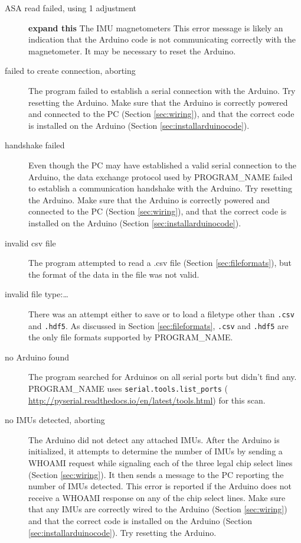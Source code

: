 \documentclass[11pt,letterpaper,article,oneside]{memoir}
\newcommand{\name}{PROGRAM\_NAME}
\newcommand{\csv}{\texttt{.csv}}
\newcommand{\hdf}{\texttt{.hdf5}}
\begin{document}
\begin{description}

\item[ASA read failed, using 1 adjustment]
\textbf{expand this}
The IMU magnetometers 
This error message is likely an indication that the Arduino code is not
communicating correctly with the magnetometer. It may be necessary to reset the
Arduino.

\item[failed to create connection, aborting]
The program failed to establish a serial connection with the Arduino.  Try
resetting the Arduino.  Make sure that the Arduino is correctly powered and
connected to the PC (Section \ref{sec:wiring}), and that the correct code is
installed on the Arduino (Section \ref{sec:installarduinocode}).

\item[handshake failed]
Even though the PC may have established a valid serial connection to the
Arduino, the data exchange protocol used by \name{} failed to establish a
communication handshake with the Arduino.  Try resetting the Arduino.  Make sure
that the Arduino is correctly powered and connected to the PC (Section
\ref{sec:wiring}), and that the correct code is installed on the Arduino
(Section \ref{sec:installarduinocode}).

\item[invalid csv file]
The program attempted to read a .csv file (Section \ref{sec:fileformats}), but
the format of the data in the file was not valid.

\item[invalid file type:\ldots]
There was an attempt either to save or to load a filetype other than
\csv{} and \hdf{}. As discussed in Section \ref{sec:fileformats},
\csv{} and \hdf{} are the only file formats supported by \name.

\item[no Arduino found]
The program searched for Arduinos on all serial ports but didn't find any.
\name{} uses \texttt{serial.tools.list\_ports} (
\url{http://pyserial.readthedocs.io/en/latest/tools.html}) for this scan.

\item[no IMUs detected, aborting]
The Arduino did not detect any attached IMUs.  After the Arduino is initialized,
it attempts to determine the number of IMUs by sending a WHOAMI request while
signaling each of the three legal chip select lines (Section \ref{sec:wiring}).
It then sends a message to the PC reporting the number of IMUs detected. This
error is reported if the Arduino does not receive a WHOAMI response on any of
the chip select lines.  Make sure that any IMUs are correctly wired to the
Arduino (Section \ref{sec:wiring}) and that the correct code is installed on the
Arduino (Section \ref{sec:installarduinocode}). Try resetting the Arduino.


\end{description}
\end{document}
